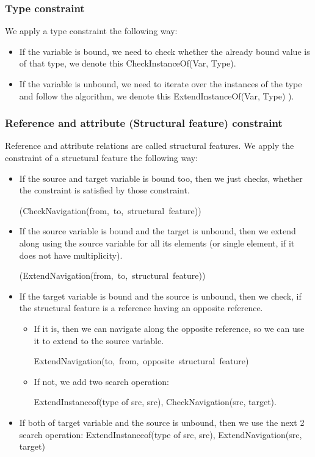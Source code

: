 \subsubsection{Type constraint}
We apply a type constraint the following way:

\begin{itemize}
\item If the variable is bound, we need to check whether the already bound value is of that type, we denote this CheckInstanceOf(Var, Type).
\item If the variable is unbound, we need to iterate over the instances of the type and follow the algorithm, we denote this ExtendInstanceOf(Var, Type) ).
\end{itemize}


\subsubsection{Reference and attribute (Structural feature) constraint}

Reference and attribute relations are called structural features.
We apply the constraint of a structural feature the following way:
\begin{itemize}
	\item If the source and target variable is bound too, then we just checks, whether the constraint is satisfied by those constraint. 
	
	\mbox{(CheckNavigation(from, to, structural feature))}
	\item If the source variable is bound and the target is unbound, then we extend along using the source variable for all its elements (or single element, if it does not have multiplicity). 
	
	\mbox{(ExtendNavigation(from, to, structural feature))}
	\item If the target variable is bound and the source is unbound, then we check, if the structural feature is a reference having an opposite reference. 
	\begin{itemize}
		\item If it is, then we can navigate along the opposite reference, so we can use it to extend to the source variable. 
		
		\mbox{ExtendNavigation(to, from, opposite structural feature)}
		\item If not, we add two search operation: 
		
		ExtendInstanceof(type of src, src), CheckNavigation(src, target). 
	\end{itemize}

	\item If both of  target variable and the source is unbound, then we use the next 2 search operation: ExtendInstanceof(type of src, src), ExtendNavigation(src, target)

\end{itemize}


